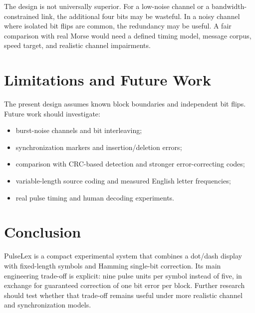 \documentclass[11pt,a4paper]{article}
\begin{document}
The design is not universally superior. For a low-noise channel or a
bandwidth-constrained link, the additional four bits may be wasteful. In a
noisy channel where isolated bit flips are common, the redundancy may be
useful. A fair comparison with real Morse would need a defined timing model,
message corpus, speed target, and realistic channel impairments.

\section{Limitations and Future Work}
The present design assumes known block boundaries and independent bit flips.
Future work should investigate:
\begin{itemize}
  \item burst-noise channels and bit interleaving;
  \item synchronization markers and insertion/deletion errors;
  \item comparison with CRC-based detection and stronger error-correcting codes;
  \item variable-length source coding and measured English letter frequencies;
  \item real pulse timing and human decoding experiments.
\end{itemize}

\section{Conclusion}
PulseLex is a compact experimental system that combines a dot/dash display
with fixed-length symbols and Hamming single-bit correction. Its main
engineering trade-off is explicit: nine pulse units per symbol instead of
five, in exchange for guaranteed correction of one bit error per block.
Further research should test whether that trade-off remains useful under
more realistic channel and synchronization models.



\end{document}
